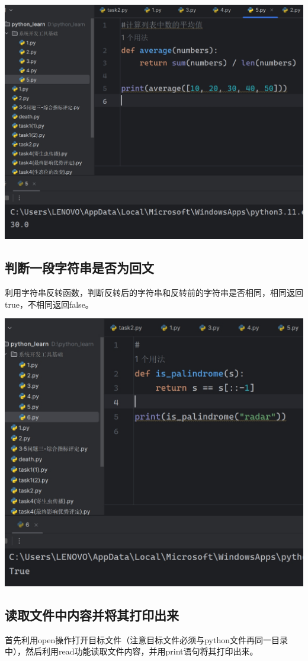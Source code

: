 \documentclass[UTF8,a4paper]{ctexart}
\begin{document}
\begin{sloppypar}
	\includegraphics[width = 14cm]{16}
	
	\subsection{判断一段字符串是否为回文}
	利用字符串反转函数，判断反转后的字符串和反转前的字符串是否相同，相同返回true，不相同返回false。
	
	\includegraphics[width = 14cm]{17}
	
	\subsection{读取文件中内容并将其打印出来}
	首先利用open操作打开目标文件（注意目标文件必须与python文件再同一目录中），然后利用read功能读取文件内容，并用print语句将其打印出来。
	

\end{sloppypar}
\end{document}
